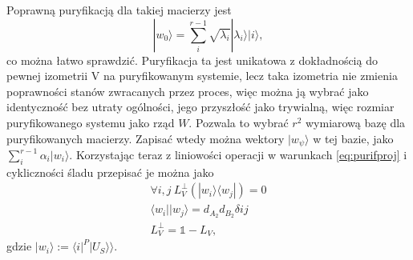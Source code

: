 \documentclass[10pt]{article} %
\newcommand{\Ket}[1]{|#1\rangle}
\newcommand{\Bra}[1]{\langle#1|}
\newcommand{\KKet}[1]{|#1\rangle\rangle}
\newcommand{\I}{\mathbb{1}}
\begin{document}
Poprawną puryfikacją dla takiej macierzy jest
\begin{equation}
\Ket{w_0} = \sum^{r-1}_i \sqrt{\lambda_i} \Ket{\lambda_i} \Ket{i},
\end{equation}
co można łatwo sprawdzić. Puryfikacja ta jest unikatowa z dokładnością do pewnej izometrii V na puryfikowanym systemie, lecz taka izometria nie zmienia
poprawności stanów zwracanych przez proces, więc można ją wybrać jako identyczność bez utraty ogólności, jego przyszłość jako trywialną, więc rozmiar puryfikowanego systemu jako rząd $W$. Pozwala to wybrać $r^2$ wymiarową bazę dla puryfikowanych macierzy. Zapisać wtedy można wektory
$\Ket{w_\psi}$ w tej bazie, jako $\sum^{r-1}_i \alpha_i \Ket{w_i}$. Korzystając teraz z liniowości operacji w warunkach \eqref{eq:purifproj} i cykliczności śladu przepisać je można jako
\begin{gather}
\forall i,j ~L^\perp_V\left(\Ket{w_i}\Bra{w_j}\right) = 0 \nonumber\\
\Bra{w_i}\Ket{w_j} = d_{A_2}d_{B_2}\delta{ij} \\
L^\perp_V = \I - L_V \nonumber,
\end{gather} gdzie $\Ket{w_i} := \Bra{i}^P \KKet{U_S}$.
\end{document}
